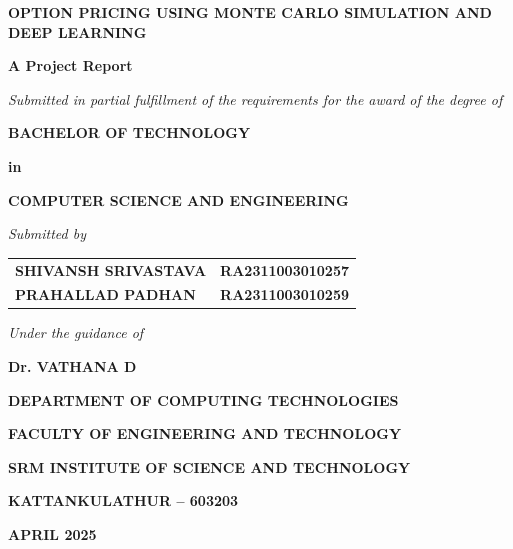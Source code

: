 \documentclass[12pt,a4paper]{report}
\begin{document}
\begin{titlepage}
\begin{center}

\vspace*{0.5cm}

\textbf{\Large OPTION PRICING USING MONTE CARLO SIMULATION AND DEEP LEARNING}

\vspace{1.5cm}

\textbf{A Project Report}

\vspace{0.3cm}

\textit{Submitted in partial fulfillment of the requirements for the award of the degree of}

\vspace{0.3cm}

\textbf{BACHELOR OF TECHNOLOGY}

\vspace{0.3cm}

\textbf{in}

\vspace{0.3cm}

\textbf{COMPUTER SCIENCE AND ENGINEERING}

\vspace{1.5cm}

\textit{Submitted by}

\vspace{0.5cm}

\begin{tabular}{ll}
\textbf{SHIVANSH SRIVASTAVA} & \textbf{RA2311003010257} \\
\textbf{PRAHALLAD PADHAN} & \textbf{RA2311003010259} \\
\end{tabular}

\vspace{1cm}

\textit{Under the guidance of}

\vspace{0.3cm}

\textbf{Dr. VATHANA D}

\vspace{1.5cm}

\textbf{DEPARTMENT OF COMPUTING TECHNOLOGIES}

\vspace{0.3cm}

\textbf{FACULTY OF ENGINEERING AND TECHNOLOGY}

\vspace{0.3cm}

\textbf{SRM INSTITUTE OF SCIENCE AND TECHNOLOGY}

\vspace{0.3cm}

\textbf{KATTANKULATHUR -- 603203}

\vspace{0.5cm}

\textbf{APRIL 2025}

\end{center}
\end{titlepage}
\end{document}
